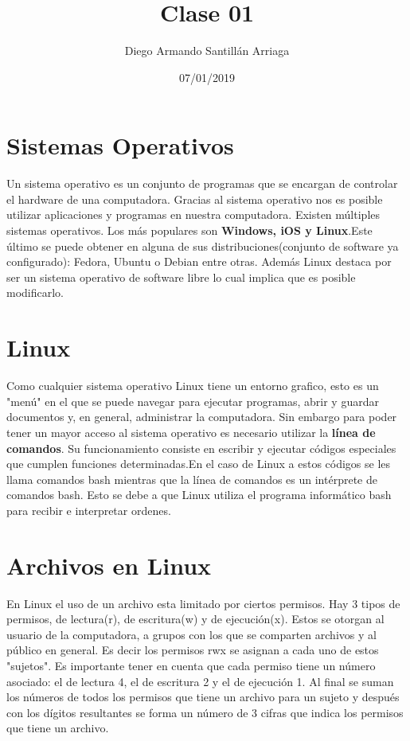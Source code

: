 \documentclass[letter paper, 12pt, oneside]{article}
\title{\Huge Clase 01}
\author{Diego Armando Santillán Arriaga}
\date{07/01/2019}
\begin{document}
	\maketitle
\newpage
\section{ Sistemas Operativos}

Un sistema operativo es un conjunto de programas que se encargan de controlar el hardware de una computadora. Gracias al sistema operativo nos es posible utilizar aplicaciones y programas en nuestra computadora. 
Existen múltiples sistemas operativos. Los más populares son \textbf{Windows, iOS y Linux}.Este último se puede obtener en alguna de sus distribuciones(conjunto de software ya configurado): Fedora, Ubuntu o Debian entre otras. Además Linux destaca por ser un sistema operativo de software libre lo cual implica que es posible modificarlo.

\section{Linux}

Como cualquier sistema operativo Linux tiene un entorno grafico, esto es un "menú" en el que se puede navegar para ejecutar programas, abrir y guardar documentos y, en general, administrar la computadora. Sin embargo para poder tener un mayor acceso al sistema operativo es necesario utilizar la \textbf{línea de comandos}. Su funcionamiento consiste en escribir y ejecutar códigos especiales que cumplen funciones determinadas.En el caso de Linux a estos códigos se les llama comandos bash mientras que la línea de comandos es un intérprete de comandos bash. Esto se debe a que Linux utiliza el programa informático bash para recibir e interpretar ordenes. 

 \section{Archivos en Linux}
 
 
 En Linux el uso de un archivo esta limitado por ciertos permisos. Hay 3 tipos de permisos, de lectura(r), de escritura(w) y de ejecución(x).
 Estos se otorgan al usuario de la computadora, a grupos con los que se comparten archivos y al público en general. Es decir los permisos rwx se asignan a cada uno de estos "sujetos". Es importante tener en cuenta que cada permiso tiene un número asociado: el de lectura 4, el de escritura 2 y el de ejecución 1. Al final se suman los números de todos los permisos que tiene un archivo para un sujeto y después con los dígitos resultantes se forma un número de 3 cifras que indica los permisos que tiene un archivo.  
 
\end{document}
